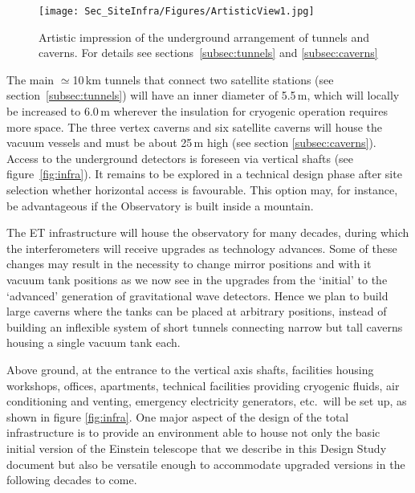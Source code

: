 \begin{wrapfigure}{r}{0.66\textwidth}
	\centering
\vskip 0.1cm
		\texttt{[image: Sec\_SiteInfra/Figures/ArtisticView1.jpg]}
	\caption{Artistic impression of the underground arrangement of tunnels and 
	caverns. For details see sections~\ref{subsec:tunnels} and \ref{subsec:caverns}}
	\label{fig:Artisticview1}
\end{wrapfigure}
The main $\simeq$10\,km tunnels that \mbox{connect} two satellite stations (see 
section~\ref{subsec:tunnels}) will have an inner diameter of 5.5\,m, which will \mbox{locally} 
be increased to 6.0\,m wherever the insulation for \mbox{cryogenic} operation requires more 
space. The three {\mbox vertex} caverns and six satellite caverns will house the 
vacuum \mbox{vessels} and must be about 25\,m high (see section \ref{subsec:caverns}). 
Access to the \mbox{underground} detectors is foreseen via vertical shafts (see 
figure~\ref{fig:infra}). It remains to be explored in a technical design phase after site 
selection whether horizontal access is favourable. This option may, for instance, be 
advantageous if the \mbox{Observatory} is built inside a mountain. 

The ET infrastructure will house the observatory for many decades, during which 
the interferometers will receive upgrades as technology advances. Some of these 
changes may result in the necessity to change mirror positions and with it vacuum 
tank positions as we now see in the upgrades from the `initial' to the `advanced' 
generation of gravitational wave detectors. Hence we plan to build large caverns 
where the tanks can be placed at arbitrary positions, instead of building an inflexible 
system of short tunnels connecting narrow but tall caverns housing a single vacuum 
tank each.  

Above ground, at the entrance to the vertical axis shafts, facilities housing workshops, 
offices, apartments, technical facilities providing cryogenic fluids, air conditioning 
and venting, emergency electricity generators, etc.\ will be set up, as shown in figure 
\ref{fig:infra}. 
One major aspect of the design of the total infrastructure is to provide an environment 
able to house not only the basic initial version of the Einstein telescope that we 
describe in this Design Study document but also be versatile enough to accommodate 
upgraded versions in the following decades to come.   
\FloatBarrier
